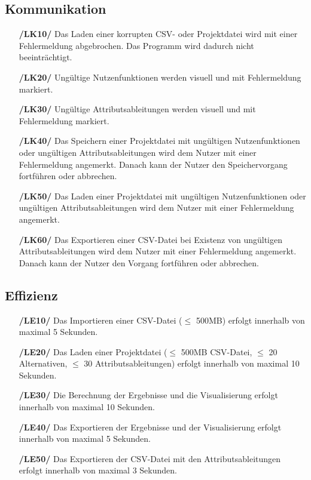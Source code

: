 \documentclass{article}
\begin{document}
\subsection{Kommunikation}
\begin{itemize}
    \item[\textbf{/LK10/}] Das Laden einer korrupten CSV- oder Projektdatei wird mit einer Fehlermeldung abgebrochen. Das Programm wird dadurch nicht beeinträchtigt.
    \item[\textbf{/LK20/}] Ungültige Nutzenfunktionen werden visuell und mit Fehlermeldung markiert.
    \item[\textbf{/LK30/}] Ungültige Attributsableitungen werden visuell und mit Fehlermeldung markiert.
    \item[\textbf{/LK40/}] Das Speichern einer Projektdatei mit ungültigen Nutzenfunktionen oder ungültigen Attributsableitungen wird dem Nutzer mit einer Fehlermeldung angemerkt. Danach kann der Nutzer den Speichervorgang fortführen oder abbrechen.
    \item[\textbf{/LK50/}] Das Laden einer Projektdatei mit ungültigen Nutzenfunktionen oder ungültigen Attributsableitungen wird dem Nutzer mit einer Fehlermeldung angemerkt.
    \item[\textbf{/LK60/}] Das Exportieren einer CSV-Datei bei Existenz von ungültigen Attributsableitungen wird dem Nutzer mit einer Fehlermeldung angemerkt. Danach kann der Nutzer den Vorgang fortführen oder abbrechen.
\end{itemize}
\subsection{Effizienz}
\begin{itemize}
    \item[\textbf{/LE10/}] Das Importieren einer CSV-Datei ($\leq$ 500MB) erfolgt innerhalb von maximal 5 Sekunden.
    \item[\textbf{/LE20/}] Das Laden einer Projektdatei ($\leq$ 500MB CSV-Datei, $\leq$ 20 Alternativen, $\leq$ 30 Attributsableitungen) erfolgt innerhalb von maximal 10 Sekunden.
    \item[\textbf{/LE30/}] Die Berechnung der Ergebnisse und die Visualisierung erfolgt innerhalb von maximal 10 Sekunden.
    \item[\textbf{/LE40/}] Das Exportieren der Ergebnisse und der Visualisierung erfolgt innerhalb von maximal 5 Sekunden.
    \item[\textbf{/LE50/}] Das Exportieren der CSV-Datei mit den Attributsableitungen erfolgt innerhalb von maximal 3 Sekunden.
\end{itemize}
\end{document}
